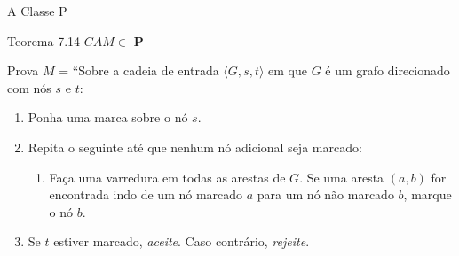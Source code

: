 \documentclass[xcolor=dvipsnames,table]{beamer}
\begin{document}
	\begin{frame}{A Classe P}
		\begin{block}{Teorema 7.14}
			$CAM \in$ {\bf P}
		\end{block} \pause
		\begin{block}{Prova}
			$M$ = ``Sobre a cadeia de entrada $\langle G, s, t \rangle$ em que $G$ é um grafo direcionado com nós $s$ e $t$:
			\begin{enumerate}
				\item Ponha uma marca sobre o nó $s$.
				\item Repita o seguinte até que nenhum nó adicional seja marcado:
				\begin{enumerate}
					\item Faça uma varredura em todas as arestas de $G$. Se uma aresta $(a,b)$ for encontrada indo de um nó marcado $a$ para um nó não marcado $b$, marque o nó $b$.
				\end{enumerate}
				\item Se $t$ estiver marcado, {\it aceite}. Caso contrário, {\it rejeite}.
			\end{enumerate}
		\end{block}
	\end{frame}
	
	\begin{frame}
		\titlepage
	\end{frame}
	
\end{document}
